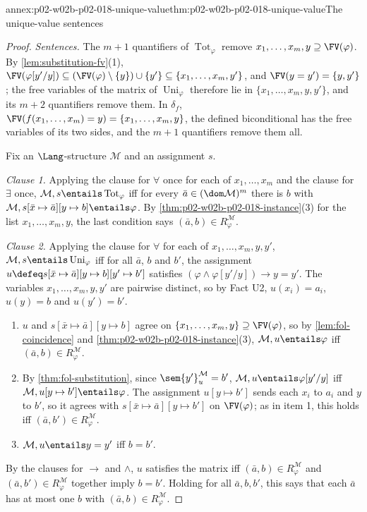\begin{annexitem}{annex:p02-w02b-p02-018-unique-value}{thm:p02-w02b-p02-018-unique-value}{The unique-value sentences}
\begin{proof}
\emph{Sentences.}  The \(m+1\) quantifiers of \(\operatorname{Tot}_{\varphi}\)
remove \(x_1,\ldots,x_m,y\supseteq\FV(\varphi)\).  By
\cref{lem:substitution-fv}(1),
\(\FV(\varphi[y'/y])\subseteq(\FV(\varphi)\setminus\{y\})\cup\{y'\}
\subseteq\{x_1,\ldots,x_m,y'\}\), and \(\FV(y=y')=\{y,y'\}\); the free
variables of the matrix of \(\operatorname{Uni}_{\varphi}\) therefore lie in
\(\{x_1,\ldots,x_m,y,y'\}\), and its \(m+2\) quantifiers remove them.  In
\(\delta_f\), \(\FV(f(x_1,\ldots,x_m)=y)=\{x_1,\ldots,x_m,y\}\), the defined
biconditional has the free variables of its two sides, and the \(m+1\)
quantifiers remove them all.

Fix an \(\Lang\)-structure \(\mathcal M\) and an assignment \(s\).

\emph{Clause 1.}  Applying the clause for \(\forall\) once for each of
\(x_1,\ldots,x_m\) and the clause for \(\exists\) once,
\(\mathcal M,s\entails\operatorname{Tot}_{\varphi}\) iff for every
\(\bar a\in(\dom\mathcal M)^m\) there is \(b\) with
\(\mathcal M,s[\bar x\mapsto\bar a][y\mapsto b]\entails\varphi\).  By
\cref{thm:p02-w02b-p02-018-instance}(3) for the list \(x_1,\ldots,x_m,y\),
the last condition says \((\bar a,b)\in R^{\mathcal M}_{\varphi}\).

\emph{Clause 2.}  Applying the clause for \(\forall\) for each of
\(x_1,\ldots,x_m,y,y'\), \(\mathcal M,s\entails\operatorname{Uni}_{\varphi}\)
iff for all \(\bar a\), \(b\) and \(b'\), the assignment
\(u\defeq s[\bar x\mapsto\bar a][y\mapsto b][y'\mapsto b']\) satisfies
\((\varphi\land\varphi[y'/y])\to y=y'\).  The variables
\(x_1,\ldots,x_m,y,y'\) are pairwise distinct, so by Fact U2,
\(u(x_i)=a_i\), \(u(y)=b\) and \(u(y')=b'\).
\begin{enumerate}
 \item \(u\) and \(s[\bar x\mapsto\bar a][y\mapsto b]\) agree on
       \(\{x_1,\ldots,x_m,y\}\supseteq\FV(\varphi)\), so by
       \cref{lem:fol-coincidence} and
       \cref{thm:p02-w02b-p02-018-instance}(3),
       \(\mathcal M,u\entails\varphi\) iff
       \((\bar a,b)\in R^{\mathcal M}_{\varphi}\).
 \item By \cref{thm:fol-substitution}, since \(\sem{y'}^{\mathcal M}_u=b'\),
       \(\mathcal M,u\entails\varphi[y'/y]\) iff
       \(\mathcal M,u[y\mapsto b']\entails\varphi\).  The assignment
       \(u[y\mapsto b']\) sends each \(x_i\) to \(a_i\) and \(y\) to \(b'\), so
       it agrees with \(s[\bar x\mapsto\bar a][y\mapsto b']\) on
       \(\FV(\varphi)\); as in item 1, this holds iff
       \((\bar a,b')\in R^{\mathcal M}_{\varphi}\).
 \item \(\mathcal M,u\entails y=y'\) iff \(b=b'\).
\end{enumerate}
By the clauses for \(\to\) and \(\land\), \(u\) satisfies the matrix iff
\((\bar a,b)\in R^{\mathcal M}_{\varphi}\) and
\((\bar a,b')\in R^{\mathcal M}_{\varphi}\) together imply \(b=b'\).  Holding
for all \(\bar a,b,b'\), this says that each \(\bar a\) has at most one
\(b\) with \((\bar a,b)\in R^{\mathcal M}_{\varphi}\).


\end{proof}
\end{annexitem}
